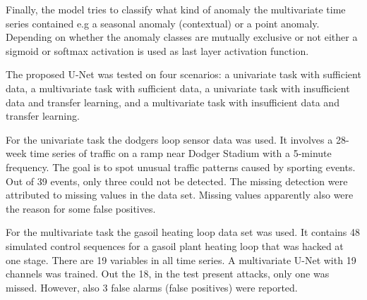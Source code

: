 Finally, the model tries to classify what kind of anomaly the multivariate time series contained e.g a seasonal anomaly (contextual) or a point anomaly. Depending on whether the anomaly classes are mutually exclusive or not either a sigmoid or softmax activation is used as last layer activation function.

The proposed U-Net was tested on four scenarios: a univariate task with sufficient data, a multivariate task with sufficient data, a univariate task with insufficient data and transfer learning, and a multivariate task with insufficient data and transfer learning. 

For the univariate task the dodgers loop sensor data was used. It involves a 28-week time series of traffic on a ramp near Dodger Stadium with a 5-minute frequency. The goal is to spot unusual traffic patterns caused by sporting events. Out of 39 events, only three could not be detected. The missing detection were attributed to missing values in the data set. Missing values apparently also were the reason for some false positives.

For the multivariate task the gasoil heating loop data set was used. It contains 48 simulated control sequences for a gasoil plant heating loop that was hacked at one stage. There are 19 variables in all time series. A multivariate U-Net with 19 channels was trained. Out the 18, in the test present attacks, only one was missed. However, also 3 false alarms (false positives) were reported. 


